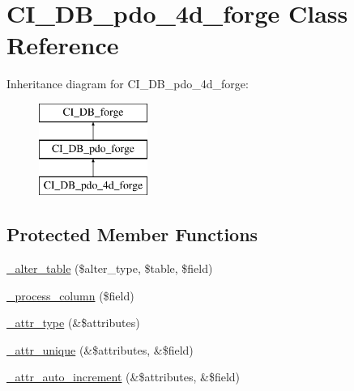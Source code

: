 \hypertarget{class_c_i___d_b__pdo__4d__forge}{}\section{C\+I\+\_\+\+D\+B\+\_\+pdo\+\_\+4d\+\_\+forge Class Reference}
\label{class_c_i___d_b__pdo__4d__forge}
Inheritance diagram for C\+I\+\_\+\+D\+B\+\_\+pdo\+\_\+4d\+\_\+forge\+:\begin{figure}[H]
\begin{center}
\leavevmode
\includegraphics[height=3.000000cm]{class_c_i___d_b__pdo__4d__forge}
\end{center}
\end{figure}
\subsection*{Protected Member Functions}
\begin{DoxyCompactItemize}
\item 
\mbox{\hyperlink{class_c_i___d_b__pdo__4d__forge_a41c6cae02f2fda8b429ad0afb9509426}{\+\_\+alter\+\_\+table}} (\$alter\+\_\+type, \$table, \$field)
\item 
\mbox{\hyperlink{class_c_i___d_b__pdo__4d__forge_a8f38f1c5b5dddecca4befbe393f3f299}{\+\_\+process\+\_\+column}} (\$field)
\item 
\mbox{\hyperlink{class_c_i___d_b__pdo__4d__forge_a8553be952084c6f7cdfff370a1d14f6b}{\+\_\+attr\+\_\+type}} (\&\$attributes)
\item 
\mbox{\hyperlink{class_c_i___d_b__pdo__4d__forge_a7568a93ea53a7392a63fffe83bb7a090}{\+\_\+attr\+\_\+unique}} (\&\$attributes, \&\$field)
\item 
\mbox{\hyperlink{class_c_i___d_b__pdo__4d__forge_a2a013a5932439c3c44f0dad3436525f7}{\+\_\+attr\+\_\+auto\+\_\+increment}} (\&\$attributes, \&\$field)
\end{DoxyCompactItemize}
